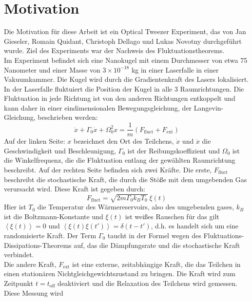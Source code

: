 \documentclass[12pt]{article}
\begin{document}
\section{Motivation}
Die Motivation für diese Arbeit ist ein Optical Tweezer Experiment, das von Jan Gieseler, Romain Quidant, Christoph Dellago und Lukas Novotny
durchgeführt wurde. Ziel des Experiments war der Nachweis des Fluktuationstheorems.\\
Im Experiment befindet sich eine Nanokugel mit einem Durchmesser von etwa 75 Nanometer und einer Masse von $3 \times 10^{-18}$ kg in einer
Laserfalle in einer Vakuumkammer. Die Kugel wird durch die Gradientenkraft des Lasers lokalisiert. In der Laserfalle fluktuiert die Position 
der Kugel in alle 3 Raumrichtungen. Die Fluktuation in jede Richtung ist von den anderen Richtungen entkoppelt und kann daher in einer 
eindimensionalen Bewegungsgleichung, der Langevin-Gleichung, beschrieben werden:
\begin{equation}
    \label{eq:langevin}
    \ddot{x} + \Gamma_0 \dot{x} + \Omega^2_0x = \frac 1 m \left(F_\text{fluct} + F_\text{ext}\right)
\end{equation}
Auf der linken Seite: 
$x$ bezeichnet den Ort des Teilchens, $\dot{x}$ und $\ddot{x}$ die Geschwindigkeit und Beschleunigung, $\Gamma_0$ ist der Reibungskoeffizient
und $\Omega_0$ ist die Winkelfrequenz, die die Fluktuation entlang der gewählten Raumrichtung beschreibt. Auf der rechten Seite befinden sich 
zwei Kräfte. Die erste, $F_\text{fluct}$ beschreibt die stochastische Kraft, die durch die Stöße mit dem umgebenden Gas verursacht wird. 
Diese Kraft ist gegeben durch:
\begin{equation}
    \label{eq:ffluct}
    F_\text{fluct} = \sqrt{2m\Gamma_0k_BT_0} \ \xi\left(t\right)
\end{equation}
Hier ist $T_0$ die Temperatur des Wärmereservoirs, also des umgebenden gases, $k_B$ ist die Boltzmann-Konstante und $\xi(t)$ ist weißes 
Rauschen für das gilt $\left\langle\xi(t)\right\rangle= 0$ und $\left\langle\xi(t)\xi(t')\right\rangle= \delta(t-t')$, d.h. es handelt sich um 
eine randomisierte Kraft. Der Term $\Gamma_0$ taucht in der Formel wegen des Fluktuations-Dissipations-Theorems auf, das die Dämpfungsrate
und die stochastische Kraft verbindet. \\
Die andere Kraft, $F_\text{ext}$ ist eine externe, zeitabhängige Kraft, die das Teilchen in einen stationären Nichtgleichgewichtszustand zu bringen. 
Die Kraft wird zum Zeitpunkt $t = t_\text{off}$ deaktiviert und die Relaxation des Teilchens wird gemessen. Diese Messung wird 
\end{document}
